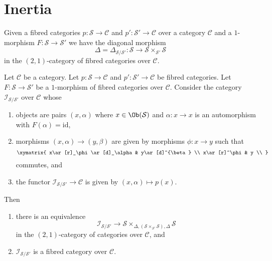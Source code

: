 \section{Inertia}
\label{section-inertia}

\noindent
Given a fibred categories $p : \mathcal{S} \to \mathcal{C}$ and
$p' : \mathcal{S}' \to \mathcal{C}$ over a category $\mathcal{C}$
and a $1$-morphism $F : \mathcal{S} \to \mathcal{S}'$
we have the diagonal morphism
$$
\Delta = \Delta_{\mathcal{S}/\mathcal{S}'} :
\mathcal{S} \longrightarrow \mathcal{S} \times_{\mathcal{S}'} \mathcal{S}
$$
in the $(2, 1)$-category of fibred categories over $\mathcal{C}$.

\begin{lemma}
\label{lemma-intertia-fibred-category}
Let $\mathcal{C}$ be a category. Let
$p : \mathcal{S} \to \mathcal{C}$ and
$p' : \mathcal{S}' \to \mathcal{C}$ be fibred categories.
Let $F : \mathcal{S} \to \mathcal{S}'$ be a $1$-morphism of
fibred categories over $\mathcal{C}$. Consider the category
$\mathcal{I}_{\mathcal{S}/\mathcal{S}'}$ over $\mathcal{C}$ whose
\begin{enumerate}
\item objects are pairs $(x, \alpha)$ where $x \in \Ob(\mathcal{S})$
and $\alpha : x \to x$ is an automorphism with $F(\alpha) = \text{id}$,
\item morphisms $(x, \alpha) \to (y, \beta)$ are given by morphisms
$\phi : x \to y$ such that
$$
\xymatrix{
x\ar[r]_\phi\ar[d]_\alpha &
y\ar[d]^{\beta}	\\
x\ar[r]^\phi &
y \\
}
$$
commutes, and
\item the functor $\mathcal{I}_{\mathcal{S}/\mathcal{S}'} \to \mathcal{C}$
is given by $(x, \alpha) \mapsto p(x)$.
\end{enumerate}
Then
\begin{enumerate}
\item there is an equivalence
$$
\mathcal{I}_{\mathcal{S}/\mathcal{S}'} \longrightarrow
\mathcal{S}
\times_{\Delta, (\mathcal{S} \times_{\mathcal{S}'} \mathcal{S}), \Delta}
\mathcal{S}
$$
in the $(2, 1)$-category of categories over $\mathcal{C}$, and
\item $\mathcal{I}_{\mathcal{S}/\mathcal{S}'}$ is a fibred category over
$\mathcal{C}$.
\end{enumerate}
\end{lemma}

